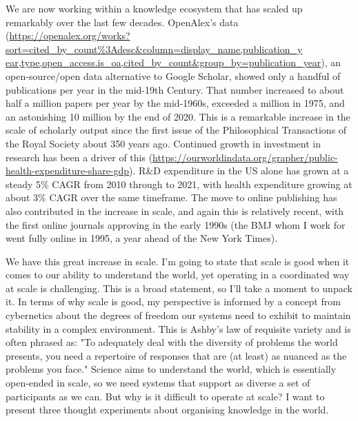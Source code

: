 \documentclass[]{hdsr}
\begin{document}
We are now working within a knowledge ecosystem that has scaled up remarkably over the last few decades. OpenAlex's data (\href{https://openalex.org/works?sort=cited\_by\_count\%3Adesc\&column=display\_name,publication\_y ear,type,open\_access.is\_oa,cited\_by\_count\&group\_by=publication\_yea}{https://openalex.org/works?sort=cited\_by\_count\%3Adesc\&column=display\_name,publication\_y ear,type,open\_access.is\_oa,cited\_by\_count\&group\_by=publication\_year}), an open-source/open data alternative to Google Scholar, showed only a handful of publications per year in the mid-19th Century. That number increased to about half a million papers per year by the mid-1960s, exceeded a million in 1975, and an astonishing 10 million by the end of 2020. This is a remarkable increase in the scale of scholarly output since the first issue of the Philosophical Transactions of the Royal Society about 350 years ago.
Continued growth in investment in research has been a driver of this (\href{https://ourworldindata.org/grapher/public-health-expenditure-share-gdp}{https://ourworldindata.org/grapher/public-health-expenditure-share-gdp}). R\&D expenditure in the US alone has grown at a steady 5\% CAGR from 2010 through to 2021, with health expenditure growing at about 3\% CAGR over the same timeframe. The move to online publishing has also contributed in the increase in scale, and again this is relatively recent, with the first online journals approving in the early 1990s (the BMJ whom I work for went fully online in 1995, a year ahead of the New York Times).

We have this great increase in scale. I’m going to state that scale is good when it comes to our ability to understand the world, yet operating in a coordinated way at scale is challenging. This is a broad statement, so I'll take a moment to unpack it. In terms of why scale is good, my perspective is informed by a concept from cybernetics about the degrees of freedom our systems need to exhibit to maintain stability in a complex environment. This is Ashby's law of requisite variety and is often phrased as: "To adequately deal with the diversity of problems the world presents, you need a repertoire of responses that are (at least) as nuanced as the problems you face." Science aims to understand the world, which is essentially open-ended in scale, so we need systems that support as diverse a set of participants as we can. But why is it difficult to operate at scale? I want to present three thought experiments about organising knowledge in the world.
\end{document}
